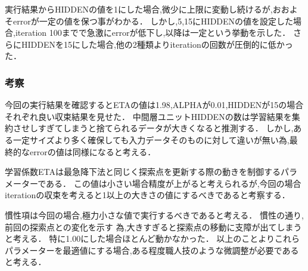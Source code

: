 実行結果からHIDDENの値を1にした場合,微少に上限に変動し続けるが,おおよそerrorが一定の値を保つ事がわかる．
しかし,5,15にHIDDENの値を設定した場合,iteration 100までで急激にerrorが低下し,以降は一定という挙動を示した．
さらにHIDDENを15にした場合,他の2種類よりiterationの回数が圧倒的に低かった．

\subsubsection{考察}
今回の実行結果を確認するとETAの値は1.98,ALPHAが0.01,HIDDENが15の場合それぞれ良い収束結果を見せた．
中間層ユニットHIDDENの数は学習結果を集約させしすぎてしまうと捨てられるデータが大きくなると推測する．
しかし,ある一定サイズより多く確保しても入力データそのものに対して違いが無い為,最終的なerrorの値は同様になると考える．

学習係数ETAは最急降下法と同じく探索点を更新する際の動きを制御するパラメーターである．
この値は小さい場合精度が上がると考えられるが,今回の場合iterationの収束を考えると1以上の大きさの値にするべきであると考察する．

慣性項は今回の場合,極力小さな値で実行するべきであると考える．
慣性の通り,前回の探索点との変化を示す\cite{sizuoka} 為,大きすぎると探索点の移動に支障が出てしまうと考える．
特に1.00にした場合ほとんど動かなかった．
以上のことよりこれらパラメーターを最適値にする場合,ある程度職人技のような微調整が必要であると考える．
